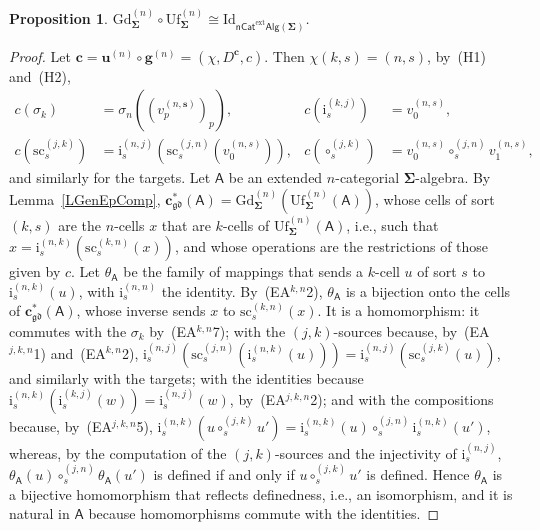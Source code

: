 \documentclass{amsart}
\theoremstyle{plain}
\newtheorem{proposition}[theorem]{Proposition}
\theoremstyle{definition}
\begin{document}
\begin{proposition}\label{PGradUnif}
$\mathrm{Gd}^{(n)}_{\mathbf{\Sigma}}\circ\mathrm{Uf}^{(n)}_{\mathbf{\Sigma}}\cong \mathrm{Id}_{\mathsf{nCat}^{\mathrm{ext}}\mathsf{Alg}(\mathbf{\Sigma})}$.
\end{proposition}
\begin{proof}
Let $\mathbf{c}=\mathbf{u}^{(n)}\circ\mathbf{g}^{(n)}=(\chi,D^{\mathbf{c}},c)$. Then $\chi(k,s)=(n,s)$, by~(H1) and~(H2),
\begin{align*}
c(\sigma_{k})&=\sigma_{n}((v^{(n,\mathbf{s})}_{p})_{p}), &
c(\mathrm{i}^{(k,j)}_{s})&=v^{(n,s)}_{0},\\
c(\mathrm{sc}^{(j,k)}_{s})&=\mathrm{i}^{(n,j)}_{s}(\mathrm{sc}^{(j,n)}_{s}(v^{(n,s)}_{0})), &
c(\circ^{(j,k)}_{s})&=v^{(n,s)}_{0}\circ^{(j,n)}_{s}v^{(n,s)}_{1},
\end{align*}
and similarly for the targets. Let $\boldsymbol{\mathsf{A}}$ be an extended $n$-categorial $\mathbf{\Sigma}$-algebra. By Lemma~\ref{LGenEpComp}, $\mathbf{c}^{\ast}_{\mathfrak{gd}}(\boldsymbol{\mathsf{A}})=\mathrm{Gd}^{(n)}_{\mathbf{\Sigma}}(\mathrm{Uf}^{(n)}_{\mathbf{\Sigma}}(\boldsymbol{\mathsf{A}}))$, whose cells of sort $(k,s)$ are the $n$-cells $x$ that are $k$-cells of $\mathrm{Uf}^{(n)}_{\mathbf{\Sigma}}(\boldsymbol{\mathsf{A}})$, i.e., such that $x=\mathrm{i}^{(n,k)}_{s}(\mathrm{sc}^{(k,n)}_{s}(x))$, and whose operations are the restrictions of those given by $c$. Let $\theta_{\boldsymbol{\mathsf{A}}}$ be the family of mappings that sends a $k$-cell $u$ of sort $s$ to $\mathrm{i}^{(n,k)}_{s}(u)$, with $\mathrm{i}^{(n,n)}_{s}$ the identity. By~(EA$^{k,n}$2), $\theta_{\boldsymbol{\mathsf{A}}}$ is a bijection onto the cells of $\mathbf{c}^{\ast}_{\mathfrak{gd}}(\boldsymbol{\mathsf{A}})$, whose inverse sends $x$ to $\mathrm{sc}^{(k,n)}_{s}(x)$. It is a homomorphism: it commutes with the $\sigma_{k}$ by~(EA$^{k,n}$7); with the $(j,k)$-sources because, by~(EA$^{j,k,n}$1) and~(EA$^{k,n}$2), $\mathrm{i}^{(n,j)}_{s}(\mathrm{sc}^{(j,n)}_{s}(\mathrm{i}^{(n,k)}_{s}(u)))=\mathrm{i}^{(n,j)}_{s}(\mathrm{sc}^{(j,k)}_{s}(u))$, and similarly with the targets; with the identities because $\mathrm{i}^{(n,k)}_{s}(\mathrm{i}^{(k,j)}_{s}(w))=\mathrm{i}^{(n,j)}_{s}(w)$, by~(EA$^{j,k,n}$2); and with the compositions because, by~(EA$^{j,k,n}$5), $\mathrm{i}^{(n,k)}_{s}(u\circ^{(j,k)}_{s}u')=\mathrm{i}^{(n,k)}_{s}(u)\circ^{(j,n)}_{s}\mathrm{i}^{(n,k)}_{s}(u')$, whereas, by the computation of the $(j,k)$-sources and the injectivity of $\mathrm{i}^{(n,j)}_{s}$, $\theta_{\boldsymbol{\mathsf{A}}}(u)\circ^{(j,n)}_{s}\theta_{\boldsymbol{\mathsf{A}}}(u')$ is defined if and only if $u\circ^{(j,k)}_{s}u'$ is defined. Hence $\theta_{\boldsymbol{\mathsf{A}}}$ is a bijective homomorphism that reflects definedness, i.e., an isomorphism, and it is natural in $\boldsymbol{\mathsf{A}}$ because homomorphisms commute with the identities.
\end{proof}
\end{document}
